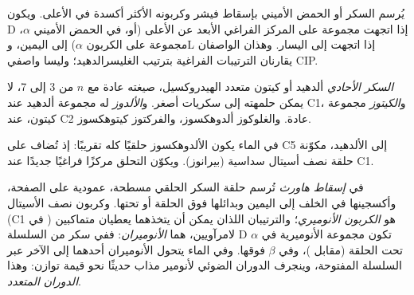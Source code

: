 \begin{definition}[D وL]\label{def:b2:biomolecules:d-l}
يُرسم السكر أو الحمض الأميني بإسقاط فيشر وكربونه الأكثر أكسدة في الأعلى. ويكون
D إذا اتجهت مجموعة  على المركز الفراغي الأبعد عن الأعلى (أو، في الحمض الأميني $\alpha$،
مجموعة  على الكربون $\alpha$) إلى اليمين، وL إذا اتجهت إلى اليسار. وهذان الواصفان
يقارنان الترتيبات الفراغية بترتيب الغليسرالدهيد؛ وليسا واصفي CIP.
\end{definition}

\begin{definition}\label{def:b2:biomolecules:sugar}
\emph{السكر الأحادي} ألدهيد أو كيتون متعدد الهيدروكسيل، صيغته عادة
 مع $n$ من 3 إلى 7، لا يمكن حلمهته إلى سكريات أصغر. 
و\emph{الألدوز} له مجموعة ألدهيد عند C1، و\emph{الكيتوز} مجموعة كيتون،
عند C2 عادة. والغلوكوز ألدوهكسوز، والفركتوز كيتوهكسوز.
\end{definition}

في الماء يكون الألدوهكسوز حلقيًا كله تقريبًا: إذ تُضاف  على C5 إلى الألدهيد، مكوّنة حلقة
نصف أسيتال سداسية (بيرانوز). ويكوّن التحلق مركزًا فراغيًا جديدًا عند C1.

\begin{definition}[الأنوميرات]\label{def:b2:biomolecules:anomer}
في \emph{إسقاط هاورث} تُرسم حلقة السكر الحلقي مسطحة،
عمودية على الصفحة، وأكسجينها في الخلف إلى اليمين وبدائلها فوق الحلقة أو تحتها.
وكربون نصف الأسيتال (C1 في ) هو \emph{الكربون الأنوميري}؛ 
والترتيبان اللذان يمكن أن يتخذهما يعطيان متماكبين لامرآويين، هما \emph{الأنوميران}: ففي سكر من السلسلة D
تكون مجموعة  الأنوميرية في $\alpha$ تحت الحلقة (مقابل )، وفي $\beta$ فوقها. وفي
الماء يتحول الأنوميران أحدهما إلى الآخر عبر السلسلة المفتوحة، وينجرف الدوران الضوئي لأنومير مذاب حديثًا
نحو قيمة توازن: وهذا \emph{الدوران المتعدد}.
\end{definition}

